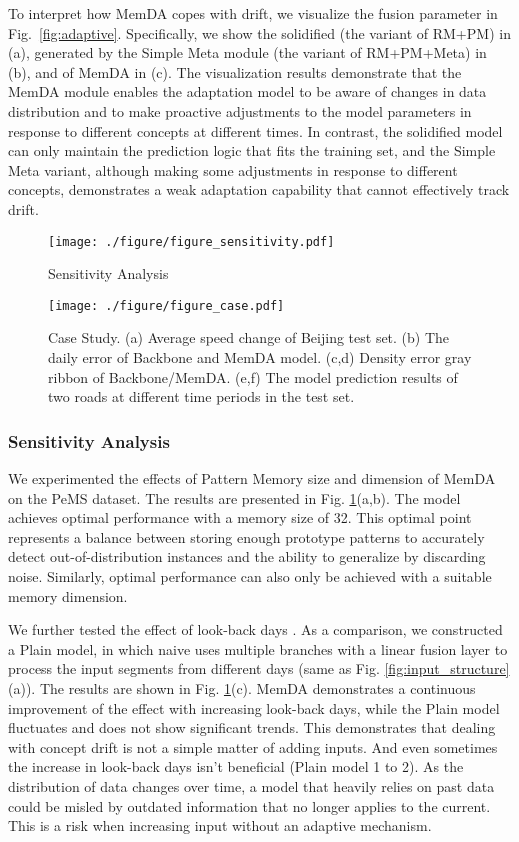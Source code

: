 \documentclass[sigconf]{acmart}
\begin{document}
To interpret how MemDA copes with drift, we visualize the fusion parameter  in Fig.~\ref{fig:adaptive}. Specifically, we show the solidified  (the variant of RM+PM) in (a),  generated by the Simple Meta module (the variant of RM+PM+Meta) in (b), and  of MemDA in (c). The visualization results demonstrate that the MemDA module enables the adaptation model to be aware of changes in data distribution and to make proactive adjustments to the model parameters in response to different concepts at different times. In contrast, the solidified model can only maintain the prediction logic that fits the training set, and the Simple Meta variant, although making some adjustments in response to different concepts, demonstrates a weak adaptation capability that cannot effectively track drift.

\begin{figure}[h]
	\centering
	\texttt{[image: ./figure/figure\_sensitivity.pdf]}
	\caption{Sensitivity Analysis}
	\label{fig:sensitivity}
\end{figure}

\begin{figure*}[h]
	\centering
	\texttt{[image: ./figure/figure\_case.pdf]}
	\caption{Case Study. (a) Average speed change of Beijing test set. (b) The daily error of Backbone and MemDA model. (c,d) Density error gray ribbon of Backbone/MemDA. (e,f) The model prediction results of two roads at different time periods in the test set.}
	\label{fig:case}
\end{figure*}

\subsubsection{Sensitivity Analysis}
We experimented the effects of Pattern Memory size  and dimension  of MemDA on the PeMS dataset. The results are presented in Fig. \ref{fig:sensitivity}(a,b). The model achieves optimal performance with a memory size of 32. This optimal point represents a balance between storing enough prototype patterns to accurately detect out-of-distribution instances and the ability to generalize by discarding noise. Similarly, optimal performance can also only be achieved with a suitable memory dimension.

We further tested the effect of look-back days . As a comparison, we constructed a Plain model, in which naive uses multiple branches with a linear fusion layer to process the input segments from different days (same as Fig. \ref{fig:input_structure} (a)). The results are shown in Fig. \ref{fig:sensitivity}(c). MemDA demonstrates a continuous improvement of the effect with increasing look-back days, while the Plain model fluctuates and does not show significant trends. This demonstrates that dealing with concept drift is not a simple matter of adding inputs. And even sometimes the increase in look-back days isn't beneficial (Plain model 1 to 2). As the distribution of data changes over time, a model that heavily relies on past data could be misled by outdated information that no longer applies to the current. This is a risk when increasing input without an adaptive mechanism.
\end{document}
